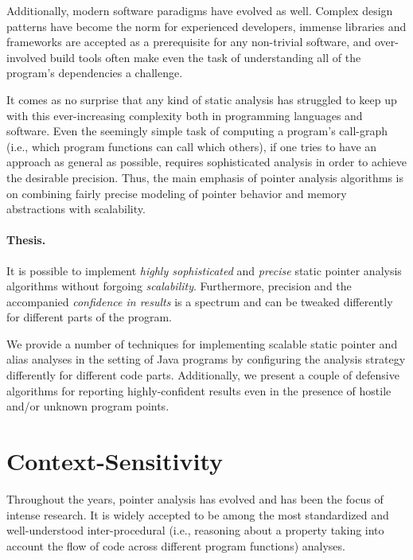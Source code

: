 Additionally, modern software paradigms have evolved as well. Complex design
patterns have become the norm for experienced developers, immense libraries and
frameworks are accepted as a prerequisite for any non-trivial software, and
over-involved build tools often make even the task of understanding all of the
program's dependencies a challenge.

It comes as no surprise that any kind of static analysis has struggled to keep
up with this ever-increasing complexity both in programming languages and
software. Even the seemingly simple task of computing a program's call-graph
(i.e., which program functions can call which others), if one tries to have an
approach as general as possible, requires sophisticated analysis in order to
achieve the desirable precision. Thus, the main emphasis of pointer analysis
algorithms is on combining fairly precise modeling of pointer behavior and
memory abstractions with scalability.

\paragraph*{Thesis.}
\begin{displayquote}
It is possible to implement \emph{highly sophisticated} and \emph{precise}
	static pointer analysis algorithms without forgoing \emph{scalability}.
	Furthermore, precision and the accompanied \emph{confidence in results} is
	a spectrum and can be tweaked differently for different parts of the
	program.
\end{displayquote}

We provide a number of techniques for implementing scalable static pointer and
alias analyses in the setting of Java programs by configuring the analysis
strategy differently for different code parts. Additionally, we present a
couple of defensive algorithms for reporting highly-confident results even in
the presence of hostile and/or unknown program points.


\section{Context-Sensitivity}

Throughout the years, pointer analysis has evolved and has been the focus of
intense research. It is widely accepted to be among the most standardized and
well-understood inter-procedural (i.e., reasoning about a property taking into
account the flow of code across different program functions) analyses.

